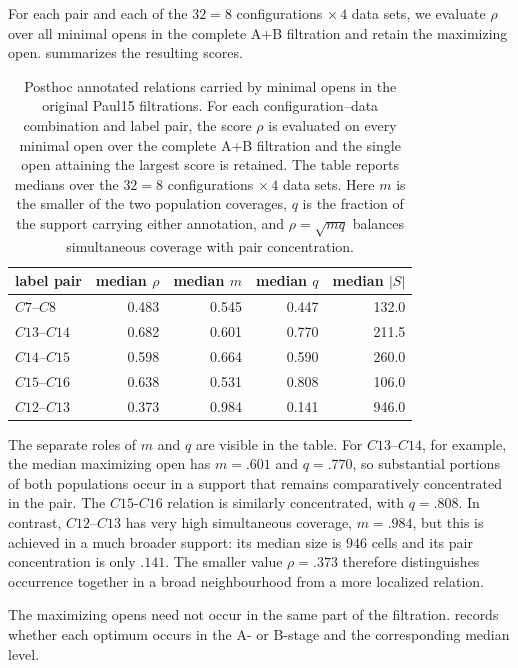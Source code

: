 \documentclass[a4paper,11pt]{article}
\theoremstyle{definition}
\theoremstyle{remark}
\begin{document}
For each pair and each of the $32=8$ configurations $\times\,4$ data sets, we evaluate $\rho$ over all minimal opens in the complete A+B filtration and retain the maximizing open.  summarizes the resulting scores.

\begin{table}[!ht]
\centering
\small
\caption{Posthoc annotated relations carried by minimal opens in the original Paul15 filtrations. For each configuration--data combination and label pair, the score $\rho$ is evaluated on every minimal open over the complete A+B filtration and the single open attaining the largest score is retained. The table reports medians over the $32=8$ configurations $\times\,4$ data sets. Here $m$ is the smaller of the two population coverages, $q$ is the fraction of the support carrying either annotation, and $\rho=\sqrt{mq}$ balances simultaneous coverage with pair concentration.}
\label{tab:paul15-original-relations}
\setlength{\tabcolsep}{4.5pt}
\begin{tabular}{@{}lrrrr@{}}
\toprule
label pair & median $\rho$ & median $m$ & median $q$ & median $|S|$ \\
\midrule
$C7$--$C8$ & 0.483 & 0.545 & 0.447 & 132.0 \\
$C13$--$C14$ & 0.682 & 0.601 & 0.770 & 211.5 \\
$C14$--$C15$ & 0.598 & 0.664 & 0.590 & 260.0 \\
$C15$--$C16$ & 0.638 & 0.531 & 0.808 & 106.0 \\
$C12$--$C13$ & 0.373 & 0.984 & 0.141 & 946.0 \\
\bottomrule
\end{tabular}
\end{table}

The separate roles of $m$ and $q$ are visible in the table. For $C13$–$C14$, for example, the median maximizing open has $m=.601$ and $q=.770$, so substantial portions of both populations occur in a support that remains comparatively concentrated in the pair. The $C15$-$C16$ relation is similarly concentrated, with $q=.808$. In contrast, $C12$–$C13$ has very high simultaneous coverage, $m=.984$, but this is achieved in a much broader support: its median size is $946$ cells and its pair concentration is only $.141$. The smaller value $\rho=.373$ therefore distinguishes occurrence together in a broad neighbourhood from a more localized relation.

The maximizing opens need not occur in the same part of the filtration.  records whether each optimum occurs in the A- or B-stage and the corresponding median level.
\end{document}

